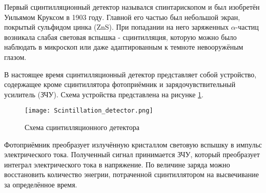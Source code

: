 Первый сцинтилляционный детектор назывался спинтарископом и был изобретён Уильямом Круксом в 1903 году. Главной его частью был небольшой экран, покрытый сульфидом цинка (ZnS). При попадании на него заряженных $\alpha$-частиц возникала слабая световая вспышка - сцинтилляция, которую можно было наблюдать в микроскоп или даже адаптированным к темноте невооружёным глазом.\par
В настоящее время сцинтилляционный детектор представляет собой устройство, содержащее кроме сцинтиллятора фотоприёмник и зарядочувствительный усилитель (ЗЧУ). Схема устройства представлена на рисунке \ref{fig:Scint_det}.\par
\begin{figure}[ht]
    \centering
    \texttt{[image: Scintillation\_detector.png]}
    \caption{Схема сцинтилляционного детектора}
    \label{fig:Scint_det}
\end{figure}
Фотоприёмник преобразует излучённую кристаллом световую вспышку в импульс электрического тока. Полученный сигнал принимается ЗЧУ, который преобразует интеграл электрического тока в напряжение. По величине заряда можно восстановить количество энегрии, потраченной сцинтиллятором на высвечивание за определённое время.
